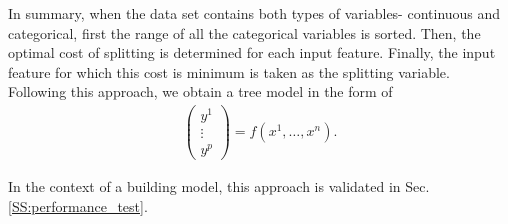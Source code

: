 
In summary, when the data set contains both types of variables- continuous and categorical, first the range of all the categorical variables is sorted. 
Then, the optimal cost of splitting is determined for each input feature. 
Finally, the input feature for which this cost is minimum is taken as the splitting variable. Following this approach, we obtain a tree model in the form of
\begin{gather}
\begin{pmatrix}
  y^1 \\
  \vdots \\
  y^p 
 \end{pmatrix}
 = \mathit{f} \left( x^1, \dots, x^n \right).
 \label{E:regtree_multi}
\end{gather}

In the context of a building model, this approach is validated in Sec. \ref{SS:performance_test}.

